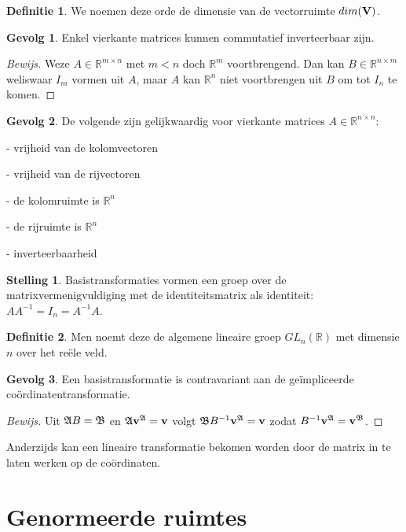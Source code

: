 \documentclass{amsart}
\theoremstyle{definition}
\newtheorem{thm}{Stelling}[section]
\newtheorem{dfn}{Definitie}[section]
\newtheorem{csq}{Gevolg}[section]
\newenvironment{bewijs}{\begin{proof}[Bewijs]}{\end{proof}}
\newcommand{\realnums}{\mathbb{R}}
\newcommand{\realn}[1][n]{\realnums^{#1}}
\newcommand{\realmx}[2][n]{\realn[#2 \times #1]}
\newcommand{\realnxn}{\realmx{n}}
\newcommand{\realmxn}{\realmx{m}}
\newcommand{\vecspace}[1][v]{\mathrm{\mathbf{\MakeUppercase#1}}}
\newcommand{\vvec}[1][v]{\mathbf{#1}}
\newcommand{\vecrow}[1][a]{\mathfrak{\MakeUppercase{#1}}}
\newcommand{\cvec}[2]{{#1}^{#2}}
\newcommand{\cvecv}[2][v]{\cvec{\vvec[#1]}{#2}}
\newcommand{\cvecva}[1][a]{\cvecv{\vecrow[#1]}}
\begin{document}
\begin{dfn}
	We noemen deze orde de dimensie van de vectorruimte $dim(\vecspace)$.
\end{dfn}

\begin{csq}
	Enkel vierkante matrices kunnen commutatief inverteerbaar zijn.
	\begin{bewijs}
		Weze $A \in \realmxn$ met $m < n$ doch $\realn[m]$ voortbrengend.
		Dan kan $B \in \realmx[m]{n}$ weliswaar $I_m$ vormen uit $A$, maar $A$ kan $\realn$ niet voortbrengen uit $B$ om tot $I_n$ te komen.
	\end{bewijs}
\end{csq}

\begin{csq}
	De volgende zijn gelijkwaardig voor vierkante matrices $A \in \realnxn$:

	- vrijheid van de kolomvectoren

	- vrijheid van de rijvectoren

	- de kolomruimte is $\realn$

	- de rijruimte is $\realn$

	- inverteerbaarheid
\end{csq}

\begin{thm}
	Basistransformaties vormen een groep over de matrixvermenigvuldiging met de identiteitsmatrix als identiteit: $AA^{-1} = I_n = A^{-1}A$.
\end{thm}

\begin{dfn}
	Men noemt deze de algemene lineaire groep $GL_n(\realnums)$ met dimensie $n$ over het reële veld.
\end{dfn}

\begin{csq}
	Een basistransformatie is contravariant aan de ge\"{i}mpliceerde co\"{o}rdinatentransformatie.
	\begin{bewijs}
		Uit $\vecrow B = \vecrow[b]$ en $\vecrow \cvecva= \vvec$ volgt $\vecrow[b] B^{-1} \cvecva = \vvec$ zodat $B^{-1} \cvecva = \cvecva[b]$.
	\end{bewijs}
\end{csq}

Anderzijds kan een lineaire transformatie bekomen worden door de matrix in te laten werken op de coördinaten.

\section{Genormeerde ruimtes}
\end{document}
